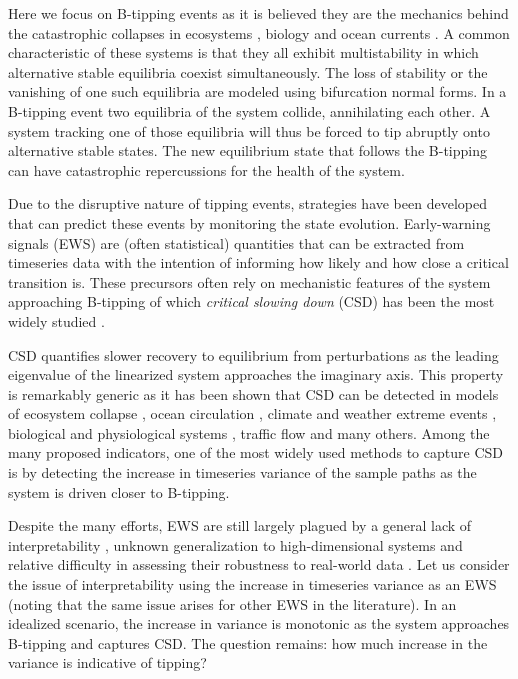 \documentclass[a4paper,fleqn]{cas-sc}
\begin{document}
Here we focus on B-tipping events as it is believed they are the mechanics behind the catastrophic collapses in ecosystems \cite{May1977}, biology \cite{Donovan2015} and ocean currents \cite{Lohmann2024,vanWesten025a}.
A common characteristic of these systems is that they all exhibit multistability in which alternative stable equilibria coexist simultaneously.
The loss of stability or the vanishing of one such equilibria are modeled using bifurcation normal forms.
In a B-tipping event two equilibria of the system collide, annihilating each other.
A system tracking one of those equilibria will thus be forced to tip abruptly onto alternative stable states.
The new equilibrium state that follows the B-tipping can have catastrophic repercussions for the health of the system.

Due to the disruptive nature of tipping events, strategies have been developed that can predict these events by monitoring the state evolution.
Early-warning signals (EWS) are (often statistical) quantities that can be extracted from timeseries data with the intention of informing how likely and how close a critical transition is.
These precursors often rely on mechanistic features of the system approaching B-tipping of which \textit{critical slowing down} (CSD) has been the most widely studied \cite{VanNes2007, Dakos2008}.

CSD quantifies slower recovery to equilibrium from perturbations as the leading eigenvalue of the linearized system approaches the imaginary axis.
This property is remarkably generic as it has been shown that CSD can be detected in models of ecosystem collapse \cite{Scheffer2009,Dakos2012}, ocean circulation \cite{Boers2021a,Boers2021b}, climate and weather extreme events \cite{Lenton2012,Prettyman2019}, biological and physiological systems \cite{Donovan2015}, traffic flow \cite{Chattopadhyay2026} and many others.
Among the many proposed indicators, one of the most widely used methods to capture CSD is by detecting the increase in timeseries variance of the sample paths as the system is driven closer to B-tipping.

Despite the many efforts, EWS are still largely plagued by a general lack of interpretability \cite{Ditlevsen2010, Donovan2026}, unknown generalization to high-dimensional systems \cite{Robinson2025} and relative difficulty in assessing their robustness to real-world data \cite{Dakos2012, Ashwin2025}.
Let us consider the issue of interpretability using the increase in timeseries variance as an EWS (noting that the same issue arises for other EWS in the literature).
In an idealized scenario, the increase in variance is monotonic as the system approaches B-tipping and captures CSD. The question remains: how much increase in the variance is indicative of tipping?
\end{document}
